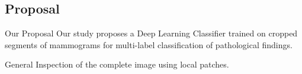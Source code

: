 \subsection{Proposal}
\begin{frame}{Our Proposal}
    Our study proposes a Deep Learning Classifier trained on cropped segments of mammograms for multi-label classification of pathological findings.

    General Inspection of the complete image using local patches.
\end{frame}

